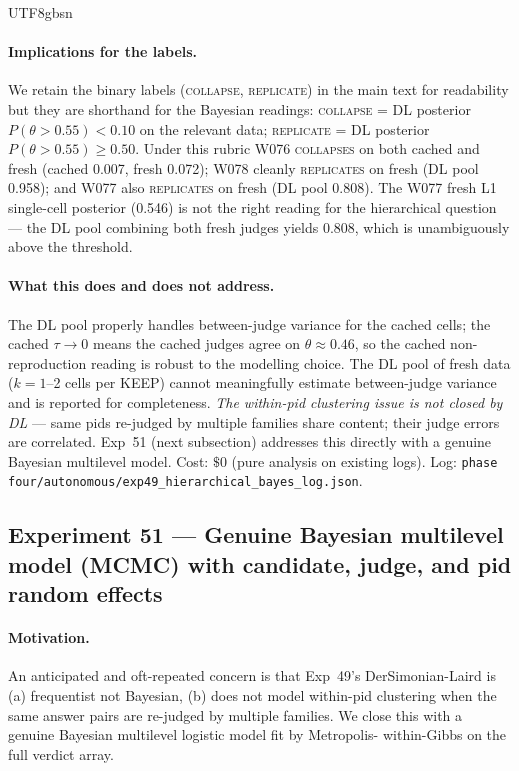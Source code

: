 \documentclass{article}
\begin{document}
\begin{CJK*}{UTF8}{gbsn}
\paragraph{Implications for the labels.} We retain the binary
labels (\textsc{collapse}, \textsc{replicate}) in the main text
for readability but they are shorthand for the Bayesian readings:
\textsc{collapse} = DL posterior \(P(\theta > 0.55) < 0.10\) on
the relevant data; \textsc{replicate} = DL posterior \(P(\theta >
0.55) \geq 0.50\). Under this rubric W076 \textsc{collapses}
on both cached and fresh (cached 0.007, fresh 0.072); W078 cleanly
\textsc{replicates} on fresh (DL pool 0.958); and W077 also
\textsc{replicates} on fresh (DL pool 0.808). The W077 fresh L1
single-cell posterior (0.546) is not the right reading for the
hierarchical question — the DL pool combining both fresh judges
yields 0.808, which is unambiguously above the threshold.

\paragraph{What this does and does not address.} The DL pool
properly handles between-judge variance for the cached cells;
the cached \(\tau \to 0\) means the cached judges agree on
\(\theta \approx 0.46\), so the cached non-reproduction reading
is robust to the modelling choice. The DL pool of fresh data
(\(k = 1\)--2 cells per KEEP) cannot meaningfully estimate
between-judge variance and is reported for completeness. \emph{The
within-pid clustering issue is not closed by DL} — same pids
re-judged by multiple families share content; their judge errors
are correlated. Exp~51 (next subsection) addresses this directly
with a genuine Bayesian multilevel model. Cost: \(\$0\) (pure
analysis on existing logs). Log:
\texttt{phase four/autonomous/exp49\_hierarchical\_bayes\_log.json}.

\subsection{Experiment 51 --- Genuine Bayesian multilevel model
(MCMC) with candidate, judge, and pid random effects}
\label{sec:exp51}

\paragraph{Motivation.} An anticipated and oft-repeated concern is
that Exp~49's DerSimonian-Laird is (a) frequentist not Bayesian,
(b) does not model within-pid clustering when the same answer
pairs are re-judged by multiple families. We close this with a
genuine Bayesian multilevel logistic model fit by Metropolis-
within-Gibbs on the full verdict array.


\end{CJK*}
\end{document}
